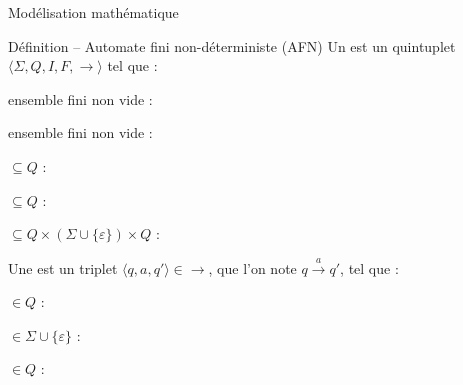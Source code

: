 
\begingroup

\begin{frame}{Modélisation mathématique}

  \begin{block}{Définition -- Automate fini non-déterministe (AFN)}
    \vspace{3mm}
    Un  est un quintuplet \alert{$\langle \Sigma, Q, I, F, \rightarrow \rangle$} tel que :
    \begin{description}[xxxxx]
    \item[\alert{$\Sigma$}] ensemble fini non vide : 
    \item[\alert{$Q$}] ensemble fini non vide : 
    \item[\alert{$I$}] $\subseteq Q$ : 
    \item[\alert{$F$}] $\subseteq Q$ : 
    \item[\alert{$\rightarrow$}] $\subseteq  Q \times (\Sigma \cup \{\varepsilon\}) \times Q$ : 
    \end{description}

    \vspace{3mm}
    Une  est un triplet \alert{$\langle q, a, q' \rangle \in \rightarrow$}, que l'on note \alert{$q\xrightarrow{a} q'$}, tel que :
    \begin{description}[xxxxx]
    \item[\alert{$q$}] $\in Q$ : 
    \item[\alert{$a$}] $\in \Sigma \cup \{\varepsilon\}$ : 
    \item[\alert{$q'$}] $\in Q$ : 
    \end{description}
  \end{block}


\end{frame}

\endgroup
